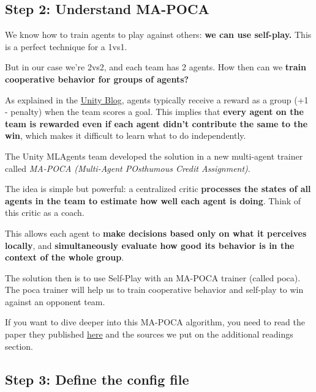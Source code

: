 \documentclass[11pt,a4paper]{article}
\begin{document}
\subsection{Step 2: Understand MA-POCA}\label{step-2-understand-ma-poca}

We know how to train agents to play against others: \textbf{we can use self-play.} This is a perfect technique for a 1vs1.

But in our case we're 2vs2, and each team has 2 agents. How then can we \textbf{train cooperative behavior for groups of agents?}

As explained in the \href{https://blog.unity.com/technology/ml-agents-v20-release-now-supports-training-complex-cooperative-behaviors}{Unity Blog}, agents typically receive a reward as a group (+1 - penalty) when the team scores a goal. This implies that \textbf{every agent on the team is rewarded even if each agent didn't contribute the same to the win}, which makes it difficult to learn what to do independently.

The Unity MLAgents team developed the solution in a new multi-agent trainer called \emph{MA-POCA (Multi-Agent POsthumous Credit Assignment)}.

The idea is simple but powerful: a centralized critic \textbf{processes the states of all agents in the team to estimate how well each agent is doing}. Think of this critic as a coach.

This allows each agent to \textbf{make decisions based only on what it perceives locally}, and \textbf{simultaneously evaluate how good its behavior is in the context of the whole group}.


The solution then is to use Self-Play with an MA-POCA trainer (called poca). The poca trainer will help us to train cooperative behavior and self-play to win against an opponent team.

If you want to dive deeper into this MA-POCA algorithm, you need to read the paper they published \href{https://arxiv.org/pdf/2111.05992.pdf}{here} and the sources we put on the additional readings section.

\subsection{Step 3: Define the config file}\label{step-3-define-the-config-file}
\end{document}
